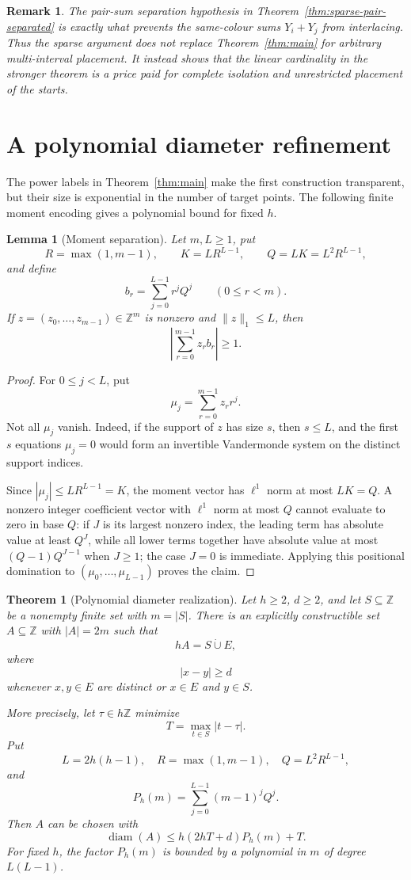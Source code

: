 \documentclass[11pt]{article}
\newtheorem{theorem}{Theorem}
\newtheorem{lemma}{Lemma}
\newtheorem{remark}{Remark}
\newcommand{\Z}{\mathbb{Z}}
\begin{document}
\begin{remark}
The pair-sum separation hypothesis in Theorem~\ref{thm:sparse-pair-separated}
is exactly what prevents the same-colour sums $Y_i+Y_j$ from interlacing. Thus
the sparse argument does not replace Theorem~\ref{thm:main} for arbitrary
multi-interval placement. It instead shows that the linear cardinality in the
stronger theorem is a price paid for complete isolation and unrestricted
placement of the starts.
\end{remark}

\section{A polynomial diameter refinement}

The power labels in Theorem~\ref{thm:main} make the first construction
transparent, but their size is exponential in the number of target points.
The following finite moment encoding gives a polynomial bound for fixed $h$.

\begin{lemma}[Moment separation]\label{lem:moment-separation}
Let $m,L\geq 1$, put
\[
 R=\max(1,m-1),
 \qquad
 K=LR^{L-1},
 \qquad
 Q=LK=L^2R^{L-1},
\]
and define
\[
 b_r=\sum_{j=0}^{L-1}r^jQ^j
 \qquad (0\leq r<m).
\]
If $z=(z_0,\ldots,z_{m-1})\in\Z^m$ is nonzero and
$\lVert z\rVert_1\leq L$, then
\[
 \left|\sum_{r=0}^{m-1}z_rb_r\right|\geq 1.
\]
\end{lemma}

\begin{proof}
For $0\leq j<L$, put
\[
 \mu_j=\sum_{r=0}^{m-1}z_rr^j.
\]
Not all $\mu_j$ vanish. Indeed, if the support of $z$ has size $s$, then
$s\leq L$, and the first $s$ equations $\mu_j=0$ would form an invertible
Vandermonde system on the distinct support indices.

Since $|\mu_j|\leq LR^{L-1}=K$, the moment vector has
$\ell^1$ norm at most $LK=Q$. A nonzero integer coefficient vector with
$\ell^1$ norm at most $Q$ cannot evaluate to zero in base $Q$: if $J$ is
its largest nonzero index, the leading term has absolute value at least
$Q^J$, while all lower terms together have absolute value at most
$(Q-1)Q^{J-1}$ when $J\geq 1$; the case $J=0$ is immediate. Applying this
positional domination to $(\mu_0,\ldots,\mu_{L-1})$ proves the claim.
\end{proof}

\begin{theorem}[Polynomial diameter realization]\label{thm:polynomial}
Let $h\geq 2$, $d\geq 2$, and let $S\subseteq\Z$ be a nonempty finite set
with $m=|S|$. There is an explicitly constructible set $A\subseteq\Z$ with
$|A|=2m$ such that
\[
 hA=S\mathbin{\dot\cup}E,
\]
where
\[
 |x-y|\geq d
\]
whenever $x,y\in E$ are distinct or $x\in E$ and $y\in S$.

More precisely, let $\tau\in h\Z$ minimize
\[
 T=\max_{t\in S}|t-\tau|.
\]
Put
\[
 L=2h(h-1),
 \quad
 R=\max(1,m-1),
 \quad
 Q=L^2R^{L-1},
\]
and
\[
 P_h(m)=\sum_{j=0}^{L-1}(m-1)^jQ^j.
\]
Then $A$ can be chosen with
\[
 \operatorname{diam}(A)
 \leq h(2hT+d)P_h(m)+T.
\]
For fixed $h$, the factor $P_h(m)$ is bounded by a polynomial in $m$ of
degree $L(L-1)$.
\end{theorem}
\end{document}
